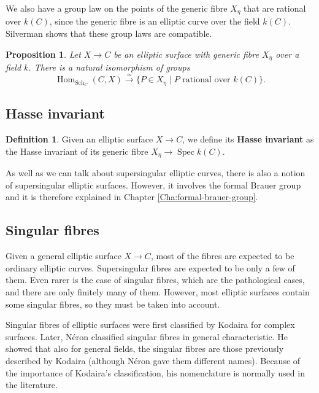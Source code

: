 \documentclass{report}
\DeclareMathOperator{\Spec}{Spec}
\DeclareMathOperator{\Hom}{Hom}
\DeclareMathOperator{\Sch}{Sch}
\newtheorem{proposition}[equation]{Proposition}
\theoremstyle{definition}
\newtheorem{definition}[equation]{Definition}
\begin{document}
We also have a group law on the points of the generic fibre $X_{\eta}$ that are rational over $k(C)$, since the generic fibre is an elliptic curve over the field $k(C)$. Silverman \cite[Proposition~3.10]{silverman1994advanced} shows that these group laws are compatible.

\begin{proposition}
Let $X\rightarrow C$ be an elliptic surface with generic fibre $X_{\eta}$ over a field $k$. There is a natural isomorphism of groups
\[\Hom_{\Sch_C}(C,X)\overset{\simeq}{\longrightarrow}\{P\in X_{\eta}\mid P\text{ rational over }k(C)\}.\]
\end{proposition}

\subsection{Hasse invariant}

\begin{definition}
Given an elliptic surface $X\rightarrow C$, we define its \textbf{Hasse invariant} as the Hasse invariant of its generic fibre $X_{\eta}\rightarrow\Spec k(C)$.
\end{definition}

As well as we can talk about supersingular elliptic curves, there is also a notion of supersingular elliptic surfaces. However, it involves the formal Brauer group and it is therefore explained in Chapter \ref{Cha:formal-brauer-group}.

\subsection{Singular fibres}

Given a general elliptic surface $X\rightarrow C$, most of the fibres are expected to be ordinary elliptic curves. Supersingular fibres are expected to be only a few of them. Even rarer is the case of singular fibres, which are the pathological cases, and there are only finitely many of them. However, most elliptic surfaces contain some singular fibres, so they must be taken into account.

Singular fibres of elliptic surfaces were first classified by Kodaira \cite[Theorem~6.2]{kodaira1963compact} for complex surfaces. Later, N\'{e}ron \cite[Section~III.17]{neron1964modeles} classified singular fibres in general characteristic. He showed that also for general fields, the singular fibres are those previously described by Kodaira (although N\'{e}ron gave them different names). Because of the importance of Kodaira's classification, his nomenclature is normally used in the literature.
\end{document}
